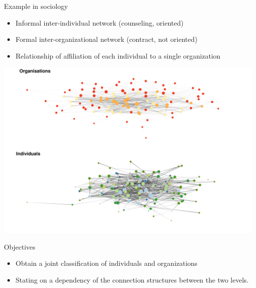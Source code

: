 \documentclass[compress,10pt]{beamer}
\begin{document}
\begin{frame}{Example in sociology}
\begin{itemize}
\item Informal inter-individual network (counseling, oriented)
\item Formal inter-organizational network (contract, not oriented)
\item Relationship of affiliation of each individual to a single organization
\end{itemize}
 \begin{center}
  \includegraphics [width = 0.85 \linewidth]{plots/deal_network.png}
  \end{center}
\end{frame}
\begin{frame}{Objectives}
  \begin{itemize}
    \item Obtain a joint classification of individuals and organizations 
    \item Stating on a dependency of the connection structures between the two levels.
  \end{itemize}


\cite{chabertliddell2019stochastic}

\end{frame}
\end{document}
